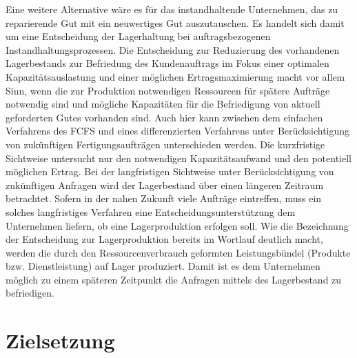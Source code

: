 Eine weitere Alternative wäre es für das instandhaltende Unternehmen, das zu reparierende Gut mit ein neuwertiges Gut auszutauschen. Es handelt sich damit um eine Entscheidung der Lagerhaltung bei auftragsbezogenen Instandhaltungsprozessen. Die Entscheidung zur Reduzierung des vorhandenen Lagerbestands zur Befriedung des Kundenauftrags im Fokus einer optimalen Kapazitätsauslastung und einer möglichen Ertragsmaximierung macht vor allem Sinn, wenn die zur Produktion notwendigen Ressourcen für spätere Aufträge notwendig sind und mögliche Kapazitäten für die Befriedigung von aktuell geforderten Gutes vorhanden sind. Auch hier kann zwischen dem einfachen Verfahrens des FCFS und eines differenzierten Verfahrens unter Berücksichtigung von zukünftigen Fertigungsaufträgen unterschieden werden. Die kurzfristige Sichtweise untersucht nur den notwendigen Kapazitätsaufwand und den potentiell möglichen Ertrag. Bei der langfristigen Sichtweise unter Berücksichtigung von zukünftigen Anfragen wird der Lagerbestand über einen längeren Zeitraum betrachtet. Sofern in der nahen Zukunft viele Aufträge eintreffen, muss ein solches langfristiges Verfahren eine Entscheidungsunterstützung dem Unternehmen liefern, ob eine Lagerproduktion erfolgen soll. Wie die Bezeichnung der Entscheidung zur Lagerproduktion bereits im Wortlauf deutlich macht, werden die durch den Ressourcenverbrauch geformten Leistungsbündel (Produkte bzw. Dienstleistung) auf Lager produziert. Damit ist es dem Unternehmen möglich zu einem späteren Zeitpunkt die Anfragen mittels des Lagerbestand zu befriedigen.




\section{Zielsetzung}

